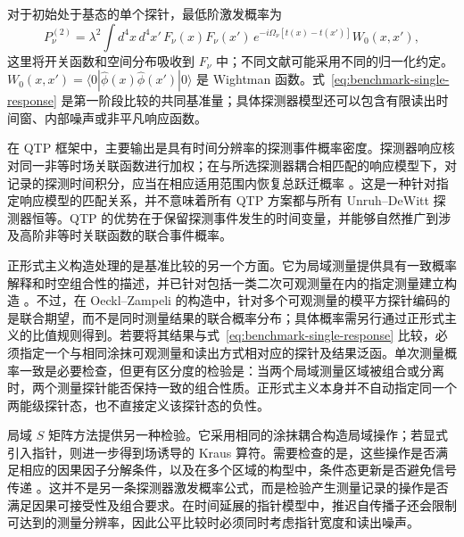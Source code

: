\documentclass[UTF8,11pt,a4paper,fontset=none]{ctexart}
\begin{document}
对于初始处于基态的单个探针，最低阶激发概率为
\begin{equation}
P_\nu^{(2)}
=\lambda^2\int d^4x\,d^4x'\,
F_\nu(x)F_\nu(x')\,e^{-i\Omega_\nu[t(x)-t(x')]}
W_0(x,x'),
\label{eq:benchmark-single-response}
\end{equation}
这里将开关函数和空间分布吸收到 $F_\nu$ 中；不同文献可能采用不同的归一化约定。$W_0(x,x')=\langle0|\hat\phi(x)\hat\phi(x')|0\rangle$ 是 Wightman 函数。式~\eqref{eq:benchmark-single-response} 是第一阶段比较的共同基准量；具体探测器模型还可以包含有限读出时间窗、内部噪声或非平凡响应函数。

在 QTP 框架中，主要输出是具有时间分辨率的探测事件概率密度。探测器响应核对同一非等时场关联函数进行加权；在与所选探测器耦合相匹配的响应模型下，对记录的探测时间积分，应当在相应适用范围内恢复总跃迁概率 \cite{AnastopoulosHuSavvidou2023,Koliopoulou2026}。这是一种针对指定响应模型的匹配关系，并不意味着所有 QTP 方案都与所有 Unruh--DeWitt 探测器恒等。QTP 的优势在于保留探测事件发生的时间变量，并能够自然推广到涉及高阶非等时关联函数的联合事件概率。

正形式主义构造处理的是基准比较的另一个方面。它为局域测量提供具有一致概率解释和时空组合性的描述，并已针对包括一类二次可观测量在内的指定测量建立构造 \cite{Oeckl2026,OecklZampeli2026}。不过，在 Oeckl--Zampeli 的构造中，针对多个可观测量的模平方探针编码的是联合期望，而不是同时测量结果的联合概率分布；具体概率需另行通过正形式主义的比值规则得到。若要将其结果与式~\eqref{eq:benchmark-single-response} 比较，必须指定一个与相同涂抹可观测量和读出方式相对应的探针及结果泛函。单次测量概率一致是必要检查，但更有区分度的检验是：当两个局域测量区域被组合或分离时，两个测量探针能否保持一致的组合性质。正形式主义本身并不自动指定同一个两能级探针态，也不直接定义该探针态的负性。

局域 $S$ 矩阵方法提供另一种检验。它采用相同的涂抹耦合构造局域操作；若显式引入指针，则进一步得到场诱导的 Kraus 算符。需要检查的是，这些操作是否满足相应的因果因子分解条件，以及在多个区域的构型中，条件态更新是否避免信号传递 \cite{Simmons2026}。这并不是另一条探测器激发概率公式，而是检验产生测量记录的操作是否满足因果可接受性及组合要求。在时间延展的指针模型中，推迟自传播子还会限制可达到的测量分辨率，因此公平比较时必须同时考虑指针宽度和读出噪声。
\end{document}
